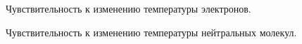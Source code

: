 \documentclass[14pt, a4paper, fleqn]{extarticle}
\begin{document}
\begin{figure}
\caption{Чувствительность к изменению температуры электронов.}
\end{figure}

\begin{figure}
\caption{Чувствительность к изменению температуры нейтральных молекул.}
\end{figure}
\end{document}

